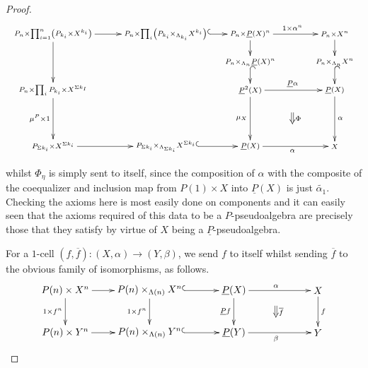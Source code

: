 \begin{proof}
	\[
		\xy
			(-10,0)*+{\scriptstyle P_n \times \prod_{i=1}^n\left(P_{k_i} \times X^{k_i}\right)}="00";
           	(30,0)*+{\scriptstyle P_n \times \prod_i \left( P_{k_i} \times_{\Lambda_{k_i}} X^{k_i} \right)}="10";
            (60,0)*+{\scriptstyle P_n \times \underline{P}(X)^n}="20";
            (90,0)*+{\scriptstyle P_n \times X^n}="30";
            (-10,-20)*+{\scriptstyle P_n \times \prod_{i} P_{k_i} \times X^{\Sigma k_I}}="01";
            (-10,-40)*+{\scriptstyle P_{\Sigma k_i} \times X^{\Sigma k_{i}}}="02";
            (60,-10)*+{\scriptstyle P_n \times_{\Lambda_n} \underline{P}(X)^n}="21";
            (60,-20)*+{\scriptstyle \underline{P}^2(X)}="22";
            (90,-10)*+{\scriptstyle P_n \times_{\Lambda_n} X^n}="31";
            (90,-20)*+{\scriptstyle \underline{P}(X)}="32";
            (30,-40)*+{\scriptstyle P_{\Sigma k_i} \times_{\Lambda_{\Sigma k_i}} X^{\Sigma k_i}}="12";
            (60,-40)*+{\scriptstyle \underline{P}(X)}="23";
            (90,-40)*+{\scriptstyle X}="33";
            {\ar "00" ; "10"};
            {\ar "00" ; "01"};
            {\ar_{\mu^P \times 1} "01" ; "02"};
            {\ar@{^{(}->} "10" ; "20"};
            {\ar "20" ; "21"};
            {\ar^{1 \times \alpha^n} "20" ; "30"};
            {\ar "30" ; "31"};
            {\ar@{^{(}->} "21" ; "22"};
            {\ar^{\underline{P}\alpha} "22" ; "32"};
            {\ar@{^{(}->} "31" ; "32"};
            {\ar_{\mu_X} "22" ; "23"};
            {\ar_{\alpha} "23" ; "33"};
            {\ar^{\alpha} "32" ; "33"};
            {\ar "02" ; "12"};
            {\ar@{^{(}->} "12" ; "23"};
            {\ar@{=>}^{\Phi} (75,-28) ; (75,-32)};
        \endxy
    \]

whilst $\Phi_\eta$ is simply sent to itself, since the composition of $\alpha$ with the composite of the coequalizer and inclusion map from $P(1) \times X$ into $\underline{P}(X)$ is just $\tilde{\alpha_1}$. Checking the axioms here is most easily done on components and it can easily seen that the axioms required of this data to be a $P$-pseudoalgebra are precisely those that they satisfy by virtue of $X$ being a $\underline{P}$-pseudoalgebra.

For a $1$-cell $(f,\overline{f}) \colon (X, \alpha) \rightarrow (Y, \beta)$, we send $f$ to itself whilst sending $\overline{f}$ to the obvious family of isomorphisms, as follows.
    \[
        \xy
            (-30,0)*+{P(n) \times X^n}="-10";
            (-30,-15)*+{P(n) \times Y^n}="-11";
            (0,0)*+{P(n) \times_{\Lambda(n)} X^n}="00";
            (30,0)*+{\underline{P}(X)}="10";
            (60,0)*+{X}="20";
            (0,-15)*+{P(n) \times_{\Lambda(n)} Y^n}="01";
            (30,-15)*+{\underline{P}(Y)}="11";
            (60,-15)*+{Y}="21";
            {\ar@{^{(}->} "00" ; "10"};
            {\ar^{\alpha} "10" ; "20"};
            {\ar_{1 \times f^n} "00" ; "01"};
            {\ar_{\underline{P}f} "10" ; "11"};
            {\ar^{f} "20" ; "21"};
            {\ar@{^{(}->} "01" ; "11"};
            {\ar_{\beta} "11" ; "21"};
            {\ar "-10" ; "00"};
            {\ar "-11" ; "01"};
            {\ar_{1 \times f^n} "-10" ; "-11"};
            {\ar@{=>}^{\overline{f}} (45,-5.5) ; (45,-9.5)};
        \endxy
    \]


\end{proof}
